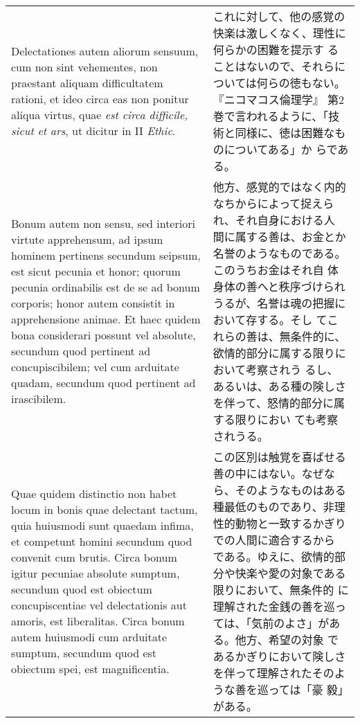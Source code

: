 \documentclass[10pt]{jsarticle}
\begin{document}
\begin{longtable}{p{21em}p{21em}}
 Delectationes autem aliorum sensuum, cum non sint vehementes, non
 praestant aliquam difficultatem rationi, et ideo circa eas non
 ponitur aliqua virtus, quae {\itshape est circa difficile, sicut et
 ars}, ut dicitur in II {\itshape Ethic}.

 &

 これに対して、他の感覚の快楽は激しくなく、理性に何らかの困難を提示す
 ることはないので、それらについては何らの徳もない。『ニコマコス倫理学』
 第2巻で言われるように、「技術と同様に、徳は困難なものについてある」か
 らである。

 \\
 

 Bonum autem non sensu, sed interiori virtute apprehensum, ad ipsum
 hominem pertinens secundum seipsum, est sicut pecunia et honor;
 quorum pecunia ordinabilis est de se ad bonum corporis; honor autem
 consistit in apprehensione animae. Et haec quidem bona considerari
 possunt vel absolute, secundum quod pertinent ad concupiscibilem; vel
 cum arduitate quadam, secundum quod pertinent ad irascibilem.

&

 他方、感覚的ではなく内的なちからによって捉えられ、それ自身における人
 間に属する善は、お金とか名誉のようなものである。このうちお金はそれ自
 体身体の善へと秩序づけられうるが、名誉は魂の把握において存する。そし
 てこれらの善は、無条件的に、欲情的部分に属する限りにおいて考察されう
 るし、あるいは、ある種の険しさを伴って、怒情的部分に属する限りにおい
 ても考察されうる。
 
\\

 Quae quidem distinctio non habet locum in bonis quae delectant
 tactum, quia huiusmodi sunt quaedam infima, et competunt homini
 secundum quod convenit cum brutis. Circa bonum igitur pecuniae
 absolute sumptum, secundum quod est obiectum concupiscentiae vel
 delectationis aut amoris, est liberalitas. Circa bonum autem
 huiusmodi cum arduitate sumptum, secundum quod est obiectum spei, est
 magnificentia.


&

この区別は触覚を喜ばせる善の中にはない。なぜなら、そのようなものはある
種最低のものであり、非理性的動物と一致するかぎりでの人間に適合するから
である。ゆえに、欲情的部分や快楽や愛の対象である限りにおいて、無条件的
に理解された金銭の善を巡っては、「気前のよさ」がある。他方、希望の対象
であるかぎりにおいて険しさを伴って理解されたそのような善を巡っては「豪
毅」がある。
 
\\




\end{longtable}
\end{document}
